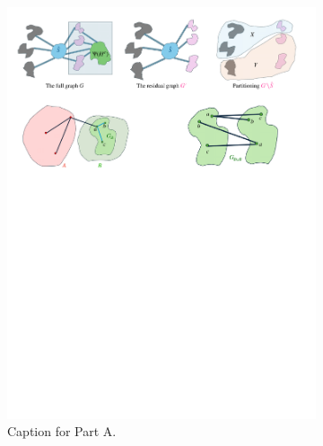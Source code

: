 \documentclass[11pt]{article}
\begin{document}
\begin{figure}
    \centering
    \begin{subfigure}[t]{0.3\textwidth}
        \centering
        \includegraphics[width=\textwidth]{assets/part-a.pdf}
        \caption{\small Caption for Part A.}
    \end{subfigure}
    \hfill
    \begin{subfigure}[t]{0.3\textwidth}
        \centering

\end{subfigure}
\end{figure}
\end{document}
